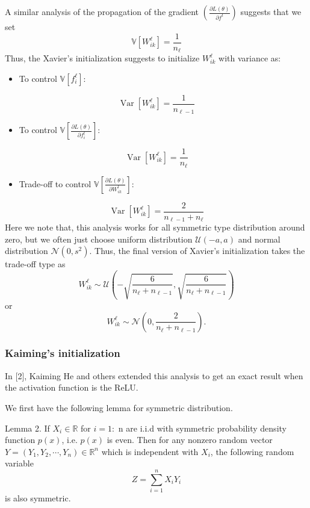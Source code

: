 \documentclass[10pt]{article}
\begin{document}
A similar analysis of the propagation of the gradient $\left(\frac{\partial L(\theta)}{\partial f^{t}}\right)$ suggests that we set
$$
\mathbb{V}\left[W_{i k}^{\ell}\right]=\frac{1}{n_{\ell}}
$$
Thus, the Xavier's initialization suggests to initialize $W_{i k}^{\ell}$ with variance as:

    \begin{itemize}
      \item To control $\mathbb{V}\left[f_{i}^{\ell}\right]:$
    \end{itemize}
$$
\operatorname{Var}\left[W_{i k}^{\ell}\right]=\frac{1}{n_{\ell-1}}
$$

    \begin{itemize}
      \item To control $\mathbb{V}\left[\frac{\partial L(\theta)}{\partial f_{i}^{l}}\right]:$
    \end{itemize}
$$
\operatorname{Var}\left[W_{i k}^{\ell}\right]=\frac{1}{n_{\ell}}
$$

    \begin{itemize}
      \item Trade-off to control $\mathbb{V}\left[\frac{\partial L(\theta)}{\partial W_{i k}^{l}}\right]:$
    \end{itemize}
$$
\operatorname{Var}\left[W_{i k}^{\ell}\right]=\frac{2}{n_{\ell-1}+n_{\ell}}
$$
Here we note that, this analysis works for all symmetric type distribution around zero, but we often just choose uniform distribution $\mathcal{U}(-a, a)$ and normal distribution $\mathcal{N}\left(0, s^{2}\right) .$ Thus, the final version of Xavier's initialization takes the trade-off type as
$$
W_{i k}^{\ell} \sim \mathcal{U}\left(-\sqrt{\frac{6}{n_{\ell}+n_{\ell-1}}}, \sqrt{\frac{6}{n_{\ell}+n_{\ell-1}}}\right)
$$
or
$$
W_{i k}^{\ell} \sim \mathcal{N}\left(0, \frac{2}{n_{\ell}+n_{\ell-1}}\right) .
$$

\subsubsection{Kaiming's initialization}
In [2], Kaiming He and others extended this analysis to get an exact result when the activation function is the ReLU.

We first have the following lemma for symmetric distribution.

Lemma 2. If $X_{i} \in \mathbb{R}$ for $i=1:$ n are i.i.d with symmetric probability density function $p(x)$, i.e. $p(x)$ is even. Then for any nonzero random vector $Y=\left(Y_{1}, Y_{2}, \cdots, Y_{n}\right) \in \mathbb{R}^{n}$ which is independent with $X_{i}$, the following random variable
$$
Z=\sum_{i=1}^{n} X_{i} Y_{i}
$$
is also symmetric.
\end{document}
